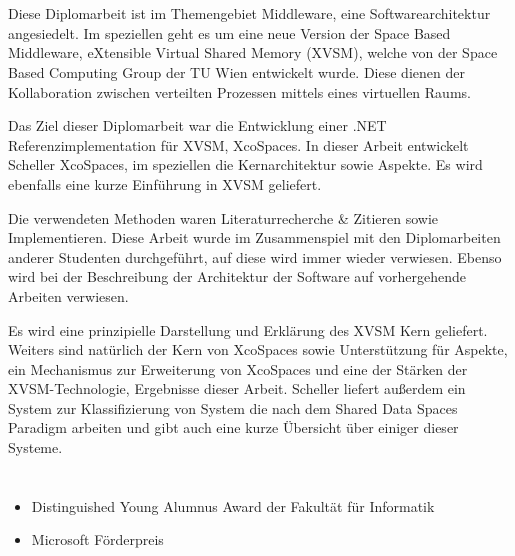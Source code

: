 %
\section*{\thesisheading} %


Diese Diplomarbeit ist im Themengebiet Middleware, eine Softwarearchitektur angesiedelt. Im speziellen geht es um eine neue Version der Space Based Middleware, eXtensible Virtual Shared Memory (XVSM), welche von der Space Based Computing Group der TU Wien entwickelt wurde. Diese dienen der Kollaboration zwischen verteilten Prozessen mittels eines virtuellen Raums.\cite[Kap.~1]{Scheller2008}

Das Ziel dieser Diplomarbeit war die Entwicklung einer .NET Referenzimplementation für XVSM, XcoSpaces. In dieser Arbeit entwickelt Scheller XcoSpaces, im speziellen die Kernarchitektur sowie Aspekte. Es wird ebenfalls eine kurze Einführung in XVSM geliefert.\cite[Kap.~1,3,4]{Scheller2008}

Die verwendeten Methoden waren Literaturrecherche \& Zitieren sowie Implementieren. Diese Arbeit wurde im Zusammenspiel mit den Diplomarbeiten anderer Studenten durchgeführt, auf diese wird immer wieder verwiesen. Ebenso wird bei der Beschreibung der Architektur der Software auf vorhergehende Arbeiten verwiesen.\cite[Kap.~4]{Scheller2008}

Es wird eine prinzipielle Darstellung und Erklärung des XVSM Kern geliefert. Weiters sind natürlich der Kern von XcoSpaces sowie Unterstützung für Aspekte, ein Mechanismus zur Erweiterung von XcoSpaces und eine der Stärken der XVSM-Technologie, Ergebnisse dieser Arbeit. Scheller liefert außerdem ein System zur Klassifizierung von System die nach dem Shared Data Spaces Paradigm arbeiten und gibt auch eine kurze Übersicht über einiger dieser Systeme.\cite[Kap.~6]{Scheller2008}

%
\section*{\thesisheading} %

\begin{itemize}
\item Distinguished Young Alumnus Award der Fakultät für Informatik
\item Microsoft Förderpreis
\end{itemize}

